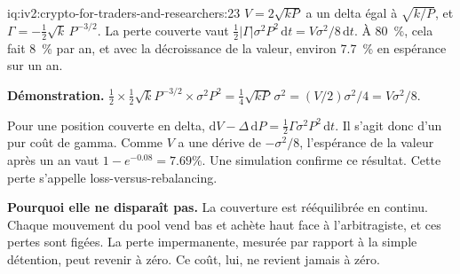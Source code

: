 \begin{solution}{iq:iv2:crypto-for-traders-and-researchers:23}
$V = 2\sqrt{kP}$ a un delta égal à $\sqrt{k/P}$, et $\Gamma = -\tfrac12\sqrt{k}\,P^{-3/2}$. La perte couverte vaut $\tfrac12|\Gamma|\sigma^2P^2\,\mathrm{d}t = V\sigma^2/8\,\mathrm{d}t$. À 80~\%, cela fait 8~\% par an, et avec la décroissance de la valeur, environ 7.7~\% en espérance sur un an.

\textbf{Démonstration.} $\tfrac12 \times \tfrac12\sqrt{k}P^{-3/2} \times \sigma^2P^2 = \tfrac14\sqrt{kP}\,\sigma^2 = (V/2)\sigma^2/4 = V\sigma^2/8$.

Pour une position couverte en delta, $\mathrm{d}V - \Delta\,\mathrm{d}P = \tfrac12\Gamma\sigma^2P^2\,\mathrm{d}t$. Il s'agit donc d'un pur coût de gamma. Comme $V$ a une dérive de $-\sigma^2/8$, l'espérance de la valeur après un an vaut $1 - e^{-0.08} = 7.69\%$. Une simulation confirme ce résultat. Cette perte s'appelle loss-versus-rebalancing.

\textbf{Pourquoi elle ne disparaît pas.} La couverture est rééquilibrée en continu. Chaque mouvement du pool vend bas et achète haut face à l'arbitragiste, et ces pertes sont figées. La perte impermanente, mesurée par rapport à la simple détention, peut revenir à zéro. Ce coût, lui, ne revient jamais à zéro.

\end{solution}

